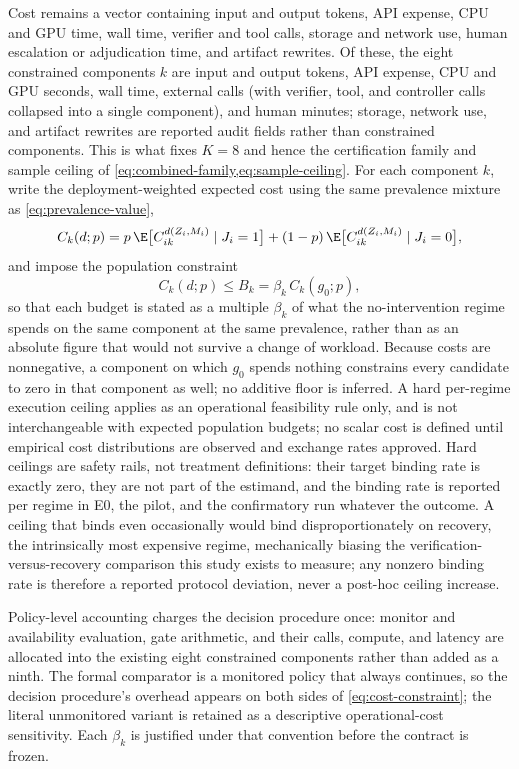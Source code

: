 Cost remains a vector containing input and output tokens, API expense, CPU and
GPU time, wall time, verifier and tool calls, storage and network use, human
escalation or adjudication time, and artifact rewrites.  Of these, the eight
constrained components $k$ are input and output tokens, API expense, CPU and
GPU seconds, wall time, external calls (with verifier, tool, and controller
calls collapsed into a single component), and human minutes; storage, network
use, and artifact rewrites are reported audit fields rather than constrained
components.  This is what fixes $K=8$ and hence the certification family and
sample ceiling of \cref{eq:combined-family,eq:sample-ceiling}.  For each
component $k$, write the deployment-weighted expected cost using the same
prevalence mixture as \eqref{eq:prevalence-value},
\begin{equation}
 C_k(d;p)=p\,\E\big[C^{d(Z_i,M_i)}_{ik}\mid J_i=1\big]
 +(1-p)\,\E\big[C^{d(Z_i,M_i)}_{ik}\mid J_i=0\big],
 \label{eq:cost-mixture}
\end{equation}
and impose the population constraint
\begin{equation}
 C_k(d;p)\le B_k=\beta_k\,C_k(g_0;p),
 \label{eq:cost-constraint}
\end{equation}
so that each budget is stated as a multiple $\beta_k$ of what the no-intervention
regime spends on the same component at the same prevalence, rather than as an
absolute figure that would not survive a change of workload.  Because costs are
nonnegative, a component on which $g_0$ spends nothing constrains every
candidate to zero in that component as well; no additive floor is inferred.
A hard per-regime
execution ceiling applies as an operational feasibility rule only, and is not
interchangeable with expected population budgets; no scalar cost is defined until
empirical cost distributions are observed and exchange rates approved.  Hard
ceilings are safety rails, not treatment definitions: their target binding rate
is exactly zero, they are not part of the estimand, and the binding rate is
reported per regime in E0, the pilot, and the confirmatory run whatever the
outcome.  A ceiling that binds even occasionally would bind disproportionately on
recovery, the intrinsically most expensive regime, mechanically biasing the
verification-versus-recovery comparison this study exists to measure; any nonzero
binding rate is therefore a reported protocol deviation, never a post-hoc ceiling
increase.

Policy-level accounting charges the decision procedure once: monitor and
availability evaluation, gate arithmetic, and their calls, compute, and latency
are allocated into the existing eight constrained components rather than added
as a ninth.  The formal comparator is a monitored policy that always continues,
so the decision procedure's overhead appears on both sides of
\eqref{eq:cost-constraint}; the literal unmonitored variant is retained as a
descriptive operational-cost sensitivity.  Each $\beta_k$ is justified under
that convention before the contract is frozen.

